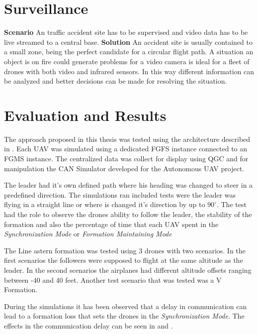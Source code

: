 \section{Surveillance}
\textbf{Scenario} \newline
An traffic accident site has to be supervised and video data has to be live
streamed to a central base.
\textbf{Solution}
An accident site is usually contained to a small zone, being the perfect
candidate for a circular flight path. A situation an object is on fire could
generate problems for a video camera is ideal for a fleet of drones with 
both video and infrared sensors. In this way different information can be 
analyzed and better decisions can be made for resolving the situation.

\section{Evaluation and Results}
The approach proposed in this thesis was tested using the architecture described in
. Each UAV was simulated
using a dedicated FGFS instance connected to an FGMS instance. The centralized
data was collect for display using QGC and for manipulation the CAN Simulator
developed for the Autonomous UAV project.

The leader had it's own defined path where his heading was changed to steer in
a predefined direction. The simulations ran included tests were the leader
was flying in a straight line or where is changed it's direction by up to 
$90^{\circ}$. The test had the role to observe the drones ability to follow
the leader,  the stability of the formation and also the percentage of time
that each UAV spent in the \textit{Synchronization Mode} or \textit{Formation Maintaining
  Mode}
  

The Line astern formation was tested using 3 drones with two scenarios. In 
the first scenarios the followers were supposed to flight at the same altitude
as the leader. In the second scenarios the airplanes had different altitude offsets
ranging between -40 and 40 feet. Another test scenario that was tested was 
a V Formation.

During the simulations it has been observed that a delay in communication 
can lead to a formation loss that sets the drones in the \textit{Synchronization Mode}.
The effects in the communication delay can be seen in 
and .

